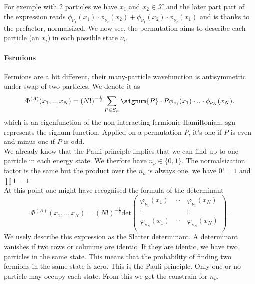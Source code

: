 \documentclass[../main.tex]{subfile}
\begin{document}
For exemple with 2 particles we have $x_1$ and $x_2\in\mathcal{X}$ and the later part part of the expression reads 
$\phi_{\nu_1}(x_1) \cdot \phi_{\nu_2}(x_2) + \phi_{\nu_1}(x_2) \cdot \phi_{\nu_2}(x_1)$ and is thanks to the prefactor, normalsized.
We now see, the permutation aims to describe each particle (an $x_i$) in each possible state $\nu_i$.

\paragraph{Fermions}
Fermions are a bit different, their many-particle wavefunction is antisymmetric under swap of two particles. We denote it as
\[
    \Phi^{(A)}(x_1,..,x_N) = \left(N!\right)^{-\frac{1}{2}} \sum_{P\in S_n} \signum{P}\cdot P \phi_{\nu_1}(x_1)\cdot ..\cdot \phi_{\nu_N}(x_N).
\]
which is an eigenfunction of the non interacting fermionic-Hamiltonian.
$\text{sgn}$ represents the signum function. Applied on a permutation $P$, it's one if $P$ is even and minus one if $P$ is odd.\\
We already know that the Pauli principle implies that we can find up to one particle in each energy state. We therfore have $n_\nu \in \{0,1\}$. The normalsization
factor is the same but the product over the $n_{\nu}$ is always one, we have $0!=1$ and $\prod 1 = 1$.  \\

At this point one might have recognised the formula of the determinant
\[
    \Phi^{(A)}(x_1,..,x_N) = \left(N!\right)^{-\frac{1}{2}} \text{det}\begin{pmatrix}
        \varphi_{\nu_1}(x_1)& \cdot\cdot &\varphi_{\nu_1}(x_N)\\
        \vdots&  &\vdots\\
        \varphi_{\nu_N}(x_1)& \cdot\cdot &\varphi_{\nu_N}(x_N)\\

    \end{pmatrix}.
\]
We usely describe this expression as the Slatter determinant. A determinant vanishes if two rows or columms are identic. If they are identic, we have two particles 
in the same state. This means that the probability of finding two fermions in the same state is zero.
This is the Pauli principle. Only one or no particle may occupy each state. From this we get the constrain for $n_{\nu}$.\\
\end{document}
